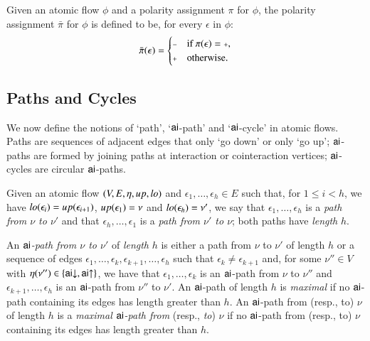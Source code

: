\begin{definition}
Given an atomic flow $\phi$ and a polarity assignment $\pi$ for $\phi$, the polarity assignment $\bar\pi$ for $\phi$ is defined to be, for every $\epsilon$ in $\phi$:
\[
\bar\pi(\epsilon)=
\begin{cases}
\pmi & \mbox{if $\pi(\epsilon)=\ppl$,}
\\
\ppl & \mbox{otherwise.}
\end{cases}
\]
\end{definition}

\subsection{Paths and Cycles}\label{subsection:PathsAndCycles}

We now define the notions of `path', `${\mathsf{ai}}$-path' and `${\mathsf{ai}}$-cycle' in atomic flows. Paths are sequences of adjacent edges that only `go down' or only `go up'; ${\mathsf{ai}}$-paths are formed by joining paths at interaction or cointeraction vertices; ${\mathsf{ai}}$-cycles are circular ${\mathsf{ai}}$-paths.

\begin{definition}\label{definition:FlowPaths}
Given an atomic flow $(V,E,\eta,{\mathit up},{\mathit lo})$ and $\epsilon_1,\dots,\epsilon_h\in E$ such that, for $1\le i<h$, we have ${\mathit lo}(\epsilon_i)={\mathit up}(\epsilon_{i+1})$, ${\mathit up}(\epsilon_1)=\nu$ and ${\mathit lo}(\epsilon_h)=\nu'$, we say that $\epsilon_1,\dots,\epsilon_h$ is a \emph{path from $\nu$ to $\nu'$} and that $\epsilon_h,\dots,\epsilon_1$ is a \emph{path from $\nu'$ to $\nu$}; both paths have \emph{length} $h$.

An \emph{${\mathsf{ai}}$-path from $\nu$ to $\nu'$} of \emph{length} $h$ is either a path from $\nu$ to $\nu'$ of length $h$ or a sequence of edges $\epsilon_1,\dots,\epsilon_k,\epsilon_{k+1},\dots,\epsilon_h$ such that $\epsilon_k \ne \epsilon_{k+1}$ and, for some $\nu''\in V$ with $\eta(\nu'')\in\{{{\mathsf{ai}}{\downarrow}},{{\mathsf{ai}}{\uparrow}}\}$, we have that $\epsilon_1,\dots,\epsilon_k$ is an ${\mathsf{ai}}$-path from $\nu$ to $\nu''$ and $\epsilon_{k+1},\dots,\epsilon_h$ is an ${\mathsf{ai}}$-path from $\nu''$ to $\nu'$. An ${\mathsf{ai}}$-path of length $h$ is \emph{maximal} if no ${\mathsf{ai}}$-path containing its edges has length greater than $h$. An ${\mathsf{ai}}$-path from (resp., to) $\nu$ of length $h$ is a \emph{maximal\/ ${\mathsf{ai}}$-path from} (resp., \emph{to}) $\nu$ if no ${\mathsf{ai}}$-path from (resp., to) $\nu$ containing its edges has length greater than $h$.
\end{definition}

